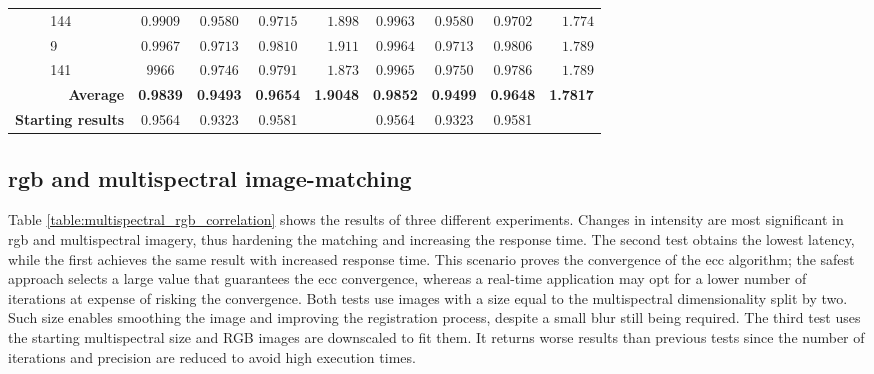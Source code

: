 \begin{table}
\begin{tabular}{ll|cccr|cccr}
        & 144 & $0.9909$ & $0.9580$ & $0.9715$ & $1.898$ & $0.9963$ & $0.9580$ & $0.9702$ & $1.774$\\
        & 9 & $0.9967$ & $0.9713$ & $0.9810$ & $1.911$ & $0.9964$ & $0.9713$ & $0.9806$ & $1.789$\\
        & 141 & $9966$ & $0.9746$ & $0.9791$ & $1.873$ & $0.9965$ & $0.9750$ & $0.9786$ & $1.789$\\
        \cmidrule{1-10}
        \multicolumn{2}{r|}{\textbf{Average}} & \textbf{0.9839} & \textbf{0.9493} & \textbf{0.9654} & \textbf{1.9048} & \textbf{0.9852} & \textbf{0.9499} & \textbf{0.9648} & \textbf{1.7817}\\
        \cmidrule{1-10}
        \multicolumn{2}{r|}{\textbf{Starting results}} & 0.9564 & 0.9323 & 0.9581 & & 0.9564 & 0.9323 & 0.9581 & \\
        \bottomrule
    \end{tabular}
    \normalsize
\end{table}
\renewcommand{\arraystretch}{1}

\subsection{\acrshort{rgb} and multispectral image-matching}

Table \ref{table:multispectral_rgb_correlation} shows the results of three different experiments. Changes in intensity are most significant in \acrshort{rgb} and multispectral imagery, thus hardening the matching and increasing the response time. The second test obtains the lowest latency, while the first achieves the same result with increased response time. This scenario proves the convergence of the \acrshort{ecc} algorithm; the safest approach selects a large value that guarantees the \acrshort{ecc} convergence, whereas a real-time application may opt for a lower number of iterations at expense of risking the convergence. Both tests use images with a size equal to the multispectral dimensionality split by two. Such size enables smoothing the image and improving the registration process, despite a small blur still being required. The third test uses the starting multispectral size and RGB images are downscaled to fit them. It returns worse results than previous tests since the number of iterations and precision are reduced to avoid high execution times. 

